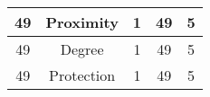 \documentclass[results.tex]{subfiles}
\begin{document}
\begin{center}
\begin{tabular}{| c || c | c | c | c |}
            \hline
            49                      & Proximity                    & 1                      & 49                      & 5                    \\
            \hline
            49                      & Degree                       & 1                      & 49                      & 5                    \\
            \hline
            49                      & Protection                   & 1                      & 49                      & 5                    \\
            \hline
        \end{tabular}
    \end{center}
\end{document}
